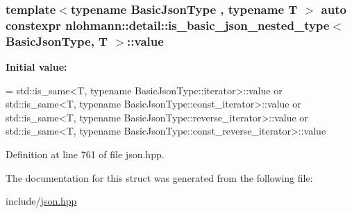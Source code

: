 \subsubsection[{\texorpdfstring{value}{value}}]{\setlength{\rightskip}{0pt plus 5cm}template$<$typename Basic\+Json\+Type , typename T $>$ auto constexpr {\bf nlohmann\+::detail\+::is\+\_\+basic\+\_\+json\+\_\+nested\+\_\+type}$<$ Basic\+Json\+Type, T $>$\+::value\hspace{0.3cm}{\ttfamily [static]}}\hypertarget{structnlohmann_1_1detail_1_1is__basic__json__nested__type_aee5fee744e5298a78d557f2ee5f090db}{}\label{structnlohmann_1_1detail_1_1is__basic__json__nested__type_aee5fee744e5298a78d557f2ee5f090db}
{\bfseries Initial value\+:}
\begin{DoxyCode}
= std::is\_same<T, typename BasicJsonType::iterator>::value or
                                  std::is\_same<T, typename BasicJsonType::const\_iterator>::value or
                                  std::is\_same<T, typename BasicJsonType::reverse\_iterator>::value or
                                  std::is\_same<T, typename BasicJsonType::const\_reverse\_iterator>::value
\end{DoxyCode}


Definition at line 761 of file json.\+hpp.



The documentation for this struct was generated from the following file\+:\begin{DoxyCompactItemize}
\item 
include/\hyperlink{json_8hpp}{json.\+hpp}\end{DoxyCompactItemize}
